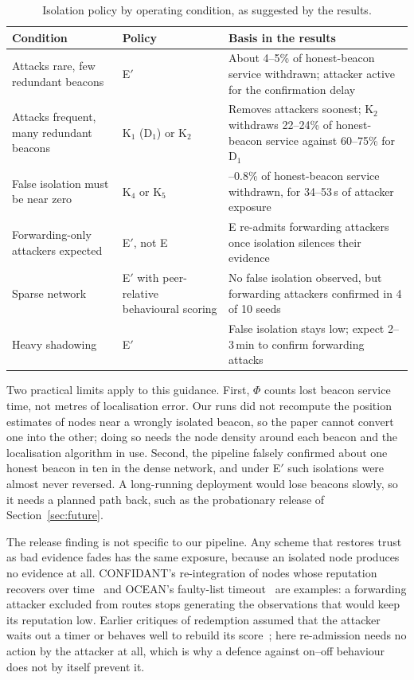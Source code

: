 \begin{table}[!t]
\caption{Isolation policy by operating condition, as suggested by the results.}
\label{tab:guide}
\centering
\footnotesize
\begin{tabular}{@{}>{\raggedright\arraybackslash}p{4.4cm}>{\raggedright\arraybackslash}p{2.2cm}>{\raggedright\arraybackslash}p{5.4cm}@{}}
\toprule
Condition & Policy & Basis in the results \\
\midrule
Attacks rare, few redundant beacons & E$'$ & About 4--5\% of honest-beacon service withdrawn; attacker active for the confirmation delay \\
Attacks frequent, many redundant beacons & K$_1$ (D$_1$) or K$_2$ & Removes attackers soonest; K$_2$ withdraws 22--24\% of honest-beacon service against 60--75\% for D$_1$ \\
False isolation must be near zero & K$_4$ or K$_5$ & 0--0.8\% of honest-beacon service withdrawn, for 34--53\,s of attacker exposure \\
Forwarding-only attackers expected & E$'$, not E & E re-admits forwarding attackers once isolation silences their evidence \\
Sparse network & E$'$ with peer-relative behavioural scoring & No false isolation observed, but forwarding attackers confirmed in 4 of 10 seeds \\
Heavy shadowing & E$'$ & False isolation stays low; expect 2--3\,min to confirm forwarding attacks \\
\bottomrule
\end{tabular}
\end{table}

Two practical limits apply to this guidance. First, $\Phi$ counts lost
beacon service time, not metres of localisation error. Our runs did not
recompute the position estimates of nodes near a wrongly isolated beacon, so
the paper cannot convert one into the other; doing so needs the node density
around each beacon and the localisation algorithm in use. Second, the
pipeline falsely confirmed about one honest beacon in ten in the dense
network, and under E$'$ such isolations were almost never reversed. A
long-running deployment would lose beacons slowly, so it needs a planned
path back, such as the probationary release of Section~\ref{sec:future}.

The release finding is not specific to our pipeline. Any scheme that
restores trust as bad evidence fades has the same exposure, because an
isolated node produces no evidence at all. CONFIDANT's re-integration of
nodes whose reputation recovers over time~\cite{buchegger2002confidant} and
OCEAN's faulty-list timeout~\cite{bansal2003ocean} are examples: a forwarding
attacker excluded from routes stops generating the observations that would
keep its reputation low. Earlier critiques of redemption assumed that the
attacker waits out a timer or behaves well to rebuild its
score~\cite{sen2010survey,sun2006attacks}; here re-admission needs no action
by the attacker at all, which is why a defence against on--off behaviour
does not by itself prevent it.

